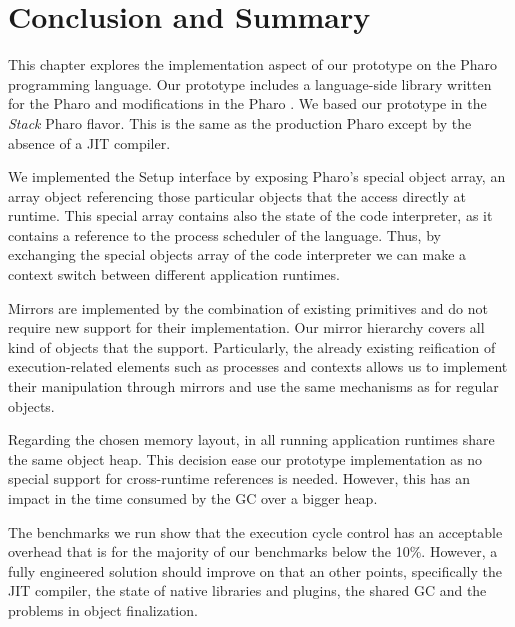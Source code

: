 \section{Conclusion and Summary}

This chapter explores the implementation aspect of our \Vtt prototype on the Pharo programming language. Our prototype includes a language-side library written for the Pharo and modifications in the Pharo \VM. We based our prototype in the \emph{Stack} Pharo \VM flavor. This \VM is the same as the production Pharo \VM except by the absence of a JIT compiler.

We implemented the \VM Setup interface by exposing Pharo's special object array, an array object referencing those particular objects that the \VM access directly at runtime. This special array contains also the state of the code interpreter, as it contains a reference to the process scheduler of the language. Thus, by exchanging the special objects array of the \VM code interpreter we can make a context switch between different application runtimes.

Mirrors are implemented by the combination of existing \VM primitives and do not require new \VM support for their implementation. Our mirror hierarchy covers all kind of objects that the \VM support. Particularly, the already existing reification of execution-related elements such as processes and contexts allows us to implement their manipulation through mirrors and use the same mechanisms as for regular objects.

Regarding the chosen memory layout, in \Vtt all running application runtimes share the same object heap. This decision ease our prototype implementation as no special support for cross-runtime references is needed. However, this has an impact in the time consumed by the GC over a bigger heap.

The benchmarks we run show that the execution cycle control has an acceptable overhead that is for the majority of our benchmarks below the 10\%. However, a fully engineered solution should improve on that an other points, specifically the JIT compiler, the state of native libraries and plugins, the shared GC and the problems in object finalization.

